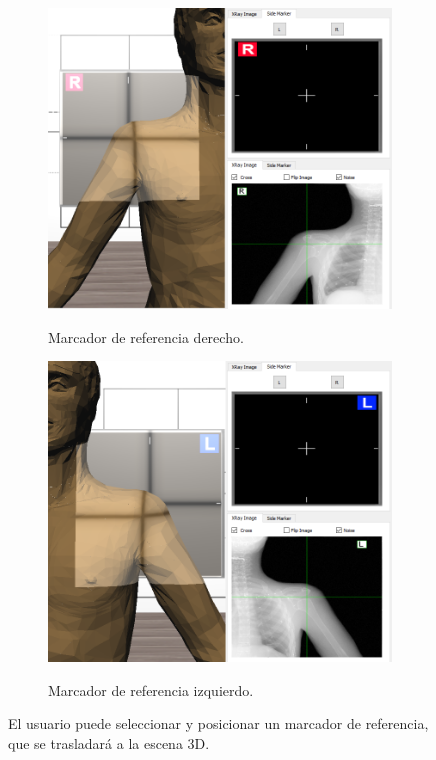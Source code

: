 \begin{figure}[ht]
    \begin{subfigure}[b]{0.45\linewidth}
        \centering
        {\includegraphics[width=\linewidth]{IMG/Rside.png}}
        \caption{Marcador de referencia derecho.}
    \end{subfigure}
    \null\hfill
     \begin{subfigure}[b]{0.45\linewidth}
        \centering
        {\includegraphics[width=\linewidth]{IMG/Lside.png}}
        \caption{Marcador de referencia izquierdo.}
    \end{subfigure}
    \caption{\label{fig:side} El usuario puede seleccionar y posicionar un marcador de referencia, que se trasladará a la escena 3D.}
   \end{figure}




